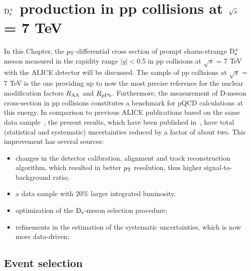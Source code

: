 \chapter{${\rm D_s^+}$ production in pp collisions at $\sqrt{s}$ = 7 TeV}
\label{chap:pp}
In this Chapter, the $p_{\rm T}$-differential cross section of prompt charm-strange ${\rm D_s^+}$ meson 
measured in the rapidity range $|y| < $0.5 in pp collisions at 
$\sqrt{s}$ = 7 TeV with the ALICE detector will be discussed.
The sample of pp collisions at $\sqrt{s}$ = 7 TeV is the one providing up to now the most precise reference for
the nuclear modification factors $R_{\rm AA}$ and $R_{\rm pPb}$. 
Furthermore, the measurement of D-meson cross-section in pp collisions 
constitutes a benchmark for pQCD calculations
at this energy.
In comparison to previous ALICE publications based on the same data 
sample~\cite{ALICE:2011aa,Abelev:2012tca,Adam:2016ich}, the present 
results, which have been published in~\cite{Acharya:2017jgo}, have total (statistical and systematic) 
uncertainties reduced by a factor of about two. This improvement has several sources: 
\begin{itemize}
\item changes in the detector calibration, alignment and track reconstruction 
algorithm, which resulted in better $p_{\rm T}$ resolution, thus higher signal-to-background ratio; 
\item a data sample with 20\% larger integrated luminosity.
\item optimization of the ${\rm D_s}$-meson selection procedure; 
\item refinements in the estimation of the systematic uncertainties, which is now more data-driven;
\end{itemize} 

\section{Event selection}
\label{sec:EvSelec}



